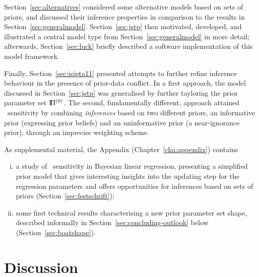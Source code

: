 Section~\ref{sec:alternatives} considered some alternative models based on sets of priors,
and discussed their inference properties in comparison to the results in Section~\ref{sec:generalmodel}.
Section~\ref{sec:jstp} then motivated, developed, and illustrated
a central model type from Section~\ref{sec:generalmodel} in more detail;
afterwards, Section~\ref{sec:luck} briefly described a software implementation
of this model framework. %

Finally, Section~\ref{sec:isipta11} presented attempts to further refine
inference behaviour in the presence of prior-data conflict.
In a first approach, the model discussed in Section~\ref{sec:jstp} %
was generalised by further tayloring the prior parameter set $\text{I}\!\Pi^{(0)}$. %
The second, fundamentally different, approach attained \pdc\ sensitivity
by combining \emph{inferences} based on two different priors,
an informative prior (expressing prior beliefs) and an uninformative prior (a near-ignorance prior),
through an imprecise weighting scheme.

As supplemental material, the Appendix (Chapter~\ref{cha:appendix}) contains
\begin{enumerate}[(i)]
\item a study of \pdc\ sensitivity in Bayesian linear regression,
presenting a simplified prior model that gives interesting insights into the updating step
for the regression parameters and offers opportunities for inferences based on sets of priors
(Section~\ref{sec:festschrift});
\item some first technical results characterising a new prior parameter set shape,
described informally in Section~\ref{sec:concluding-outlook} below
(Section~\ref{sec:boatshape}).
\end{enumerate}


\section{Discussion}
\label{sec:concluding-discussion}


